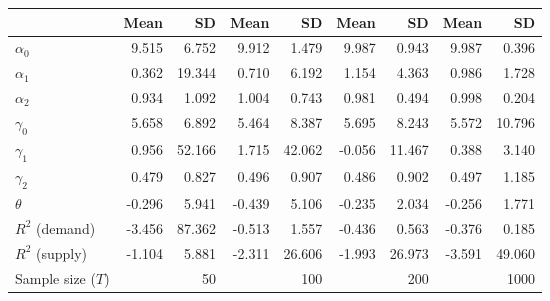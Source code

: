 
\begin{tabular}[t]{lrrrrrrrr}
\toprule
  & Mean & SD & Mean  & SD  & Mean   & SD   & Mean    & SD   \\
\midrule
$\alpha_{0}$ & 9.515 & 6.752 & 9.912 & 1.479 & 9.987 & 0.943 & 9.987 & 0.396\\
$\alpha_{1}$ & 0.362 & 19.344 & 0.710 & 6.192 & 1.154 & 4.363 & 0.986 & 1.728\\
$\alpha_{2}$ & 0.934 & 1.092 & 1.004 & 0.743 & 0.981 & 0.494 & 0.998 & 0.204\\
$\gamma_{0}$ & 5.658 & 6.892 & 5.464 & 8.387 & 5.695 & 8.243 & 5.572 & 10.796\\
$\gamma_{1}$ & 0.956 & 52.166 & 1.715 & 42.062 & -0.056 & 11.467 & 0.388 & 3.140\\
$\gamma_{2}$ & 0.479 & 0.827 & 0.496 & 0.907 & 0.486 & 0.902 & 0.497 & 1.185\\
$\theta$ & -0.296 & 5.941 & -0.439 & 5.106 & -0.235 & 2.034 & -0.256 & 1.771\\
$R^{2}$ (demand) & -3.456 & 87.362 & -0.513 & 1.557 & -0.436 & 0.563 & -0.376 & 0.185\\
$R^{2}$ (supply) & -1.104 & 5.881 & -2.311 & 26.606 & -1.993 & 26.973 & -3.591 & 49.060\\
Sample size ($T$) &  & 50 &  & 100 &  & 200 &  & 1000\\
\bottomrule
\end{tabular}

